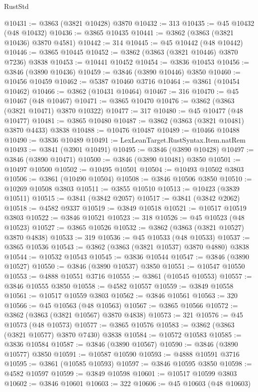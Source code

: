 \begin{lexlean}{RustStd}
\begin{coremodule}
@10431 := @3863 (@3821 @10428) @3870
@10432 := 313
@10435 := @45 @10432 (@48 @10432)
@10436 := @3865 @10435
@10441 := @3862 (@3863 (@3821 @10436) @3870 @4581)
@10442 := 314
@10445 := @45 @10442 (@48 @10442)
@10446 := @3865 @10445
@10452 := @3862 (@3863 (@3821 @10446) @3870 @7236) @3838
@10453 := @10441 @10452
@10454 := @3836 @10453
@10456 := @3846 (@3890 @10436)
@10459 := @3846 (@3890 @10446) @3850
@10460 := @10456 @10459
@10462 := @5387 @10460 @3716
@10464 := @3861 (@10454 @10462)
@10466 := @3862 (@10431 @10464)
@10467 := 316
@10470 := @45 @10467 (@48 @10467)
@10471 := @3865 @10470
@10476 := @3862 (@3863 (@3821 @10471) @3870 @10322)
@10477 := 317
@10480 := @45 @10477 (@48 @10477)
@10481 := @3865 @10480
@10487 := @3862 (@3863 (@3821 @10481) @3870 @4433) @3838
@10488 := @10476 @10487
@10489 := @10466 @10488
@10490 := @3836 @10489
@10491 := LexLeanTarget.RustSyntax.Item.natRem
@10493 := @3841 (@3901 @10491)
@10495 := @3846 (@3890 @10428)
@10497 := @3846 (@3890 @10471)
@10500 := @3846 (@3890 @10481) @3850
@10501 := @10497 @10500
@10502 := @10495 @10501
@10504 := @10493 @10502 @3803
@10506 := @3861 (@10490 @10504)
@10508 := @3846 @10506 @3850
@10510 := @10269 @10508 @3803
@10511 := @3855 @10510
@10513 := @10423 (@3839 @10511)
@10515 := @3841 (@3842 @2057)
@10517 := @3841 (@3842 @2062)
@10518 := @4582 @9337
@10519 := @3849 @10518
@10521 := @10517 @10519 @3803
@10522 := @3846 @10521
@10523 := 318
@10526 := @45 @10523 (@48 @10523)
@10527 := @3865 @10526
@10532 := @3862 (@3863 (@3821 @10527) @3870 @4838)
@10533 := 319
@10536 := @45 @10533 (@48 @10533)
@10537 := @3865 @10536
@10543 := @3862 (@3863 (@3821 @10537) @3870 @4880) @3838
@10544 := @10532 @10543
@10545 := @3836 @10544
@10547 := @3846 (@3890 @10527)
@10550 := @3846 (@3890 @10537) @3850
@10551 := @10547 @10550
@10553 := @4888 @10551 @3716
@10555 := @3861 (@10545 @10553)
@10557 := @3846 @10555 @3850
@10558 := @4582 @10557
@10559 := @3849 @10558
@10561 := @10517 @10559 @3803
@10562 := @3846 @10561
@10563 := 320
@10566 := @45 @10563 (@48 @10563)
@10567 := @3865 @10566
@10572 := @3862 (@3863 (@3821 @10567) @3870 @4838)
@10573 := 321
@10576 := @45 @10573 (@48 @10573)
@10577 := @3865 @10576
@10583 := @3862 (@3863 (@3821 @10577) @3870 @7430) @3838
@10584 := @10572 @10583
@10585 := @3836 @10584
@10587 := @3846 (@3890 @10567)
@10590 := @3846 (@3890 @10577) @3850
@10591 := @10587 @10590
@10593 := @4888 @10591 @3716
@10595 := @3861 (@10585 @10593)
@10597 := @3846 @10595 @3850
@10598 := @4582 @10597
@10599 := @3849 @10598
@10601 := @10517 @10599 @3803
@10602 := @3846 @10601
@10603 := 322
@10606 := @45 @10603 (@48 @10603)

\end{coremodule}
\end{lexlean}
